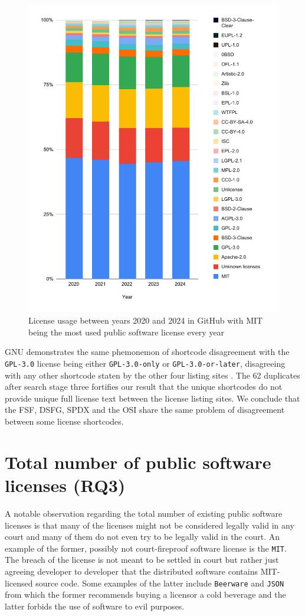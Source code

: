 \begin{figure}
	\centering
	\includegraphics[scale=0.73]{figures/figure-3-4.pdf}
	\caption{License usage between years 2020 and 2024 in GitHub with MIT being the most used public software license every year}
	\label{fig:3-4}
\end{figure}
GNU demonstrates the same phemonemon of shortcode disagreement with the \texttt{GPL-3.0} license being either \texttt{GPL-3.0-only} or \texttt{GPL-3.0-or-later}, disagreeing with any other shortcode staten by the other four listing sites \citep{gnu:licenselist}. The 62 duplicates after search stage three fortifies our result that the unique shortcodes do not provide unique full license text between the license listing sites. We conclude that the FSF, DSFG, SPDX and the OSI share the same problem of disagreement between some license shortcodes.

\section{Total number of public software licenses (RQ3)}
A notable observation regarding the total number of existing public software licenses is that many of the licenses might not be considered legally valid in any court and many of them do not even try to be legally valid in the court. An example of the former, possibly not court-fireproof software license is the \texttt{MIT}. The breach of the license is not meant to be settled in court but rather just agreeing developer to developer that the distributed software contains MIT-licensed source code. Some examples of the latter include \texttt{Beerware} and \texttt{JSON} from which the former recommends buying a licensor a cold beverage and the latter forbids the use of software to evil purposes. 

